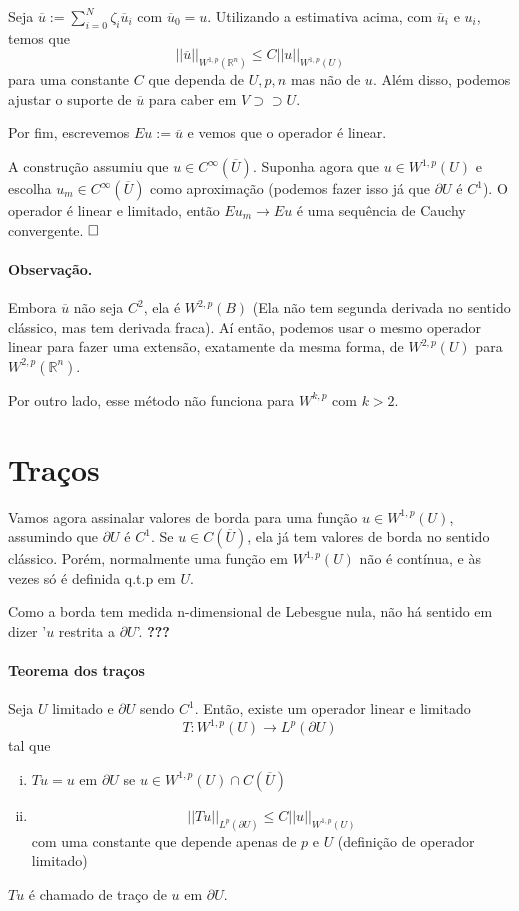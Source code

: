 \documentclass[11pt]{article}
\newcommand{\qed}{$\hfill\square$}
\newcommand{\Rn}{{\mathbb{R}^n}}
\newcommand{\pu}{\partial U}
\begin{document}
Seja \( \overline{u} := \sum_{i=0}^{N} \zeta_i \overline{u}_i \) com \( \overline{u}_0 = u \).  Utilizando a estimativa acima, com \( \overline{u}_i \) e \( u_i \), temos que \[ ||\overline{u}||_{W^{1,p}(\Rn)} \leq C ||u||_{W^{1,p}(U)} \]
para uma constante \( C \) que dependa de \( U,p,n \) mas não de \( u \). Além disso, podemos ajustar o suporte de \( \overline{u} \) para caber em \( V \supset\supset U \).

Por fim, escrevemos \( Eu:=\overline{u} \) e vemos que o operador é linear. 

A construção assumiu que \( u \in C^\infty(\overline{U}) \). Suponha agora que \( u \in W^{1,p}(U) \) e escolha \( u_m \in C^\infty(\overline{U}) \) como aproximação (podemos fazer isso já que \( \pu  \) é \( C^1 \)). O operador é linear e limitado, então \( Eu_m \rightarrow Eu \) é uma sequência de Cauchy convergente. \qed

\paragraph{Observação.} Embora $ \overline{u} $ não seja $ C^2 $, ela é $ W^{2,p}(B) $ (Ela não tem segunda derivada no sentido clássico, mas tem derivada fraca). Aí então, podemos usar o mesmo operador linear para fazer uma extensão, exatamente da mesma forma, de $ W^{2,p}(U) $ para $ W^{2,p}(\Rn) $.

Por outro lado, esse método não funciona para $ W^{k,p} $ com $ k>2 $.




\section{Traços}

Vamos agora assinalar valores de borda para uma função $u \in W^{1,p}(U)$, assumindo que $\pu$ é $C^1$. Se $u \in C(\overline{U})$, ela já tem valores de borda no sentido clássico. Porém, normalmente uma função em $W^{1,p}(U)$ não é contínua, e às vezes só é definida q.t.p em $U$. 

Como a borda tem medida n-dimensional de Lebesgue nula, não há sentido em dizer '$ u $ restrita a $ \pu $'. \textbf{???}





\paragraph{Teorema dos traços} Seja $U$ limitado e $\pu$ sendo $C^1$. Então, existe um operador linear e limitado \[ T:W^{1,p}(U)\rightarrow L^p(\pu) \] tal que \begin{enumerate}[(i)]
	\item $Tu = u$ em $\pu$ se $u \in W^{1,p}(U) \cap C(\overline{U})$
	\item \[ || Tu ||_{L^p(\pu)} \leq C ||u||_{W^{1,p}(U)} \] com uma constante que depende apenas de $p$ e $U$ (definição de operador limitado)
\end{enumerate} $Tu$ é chamado de traço de $u$ em $\pu$.
\end{document}
